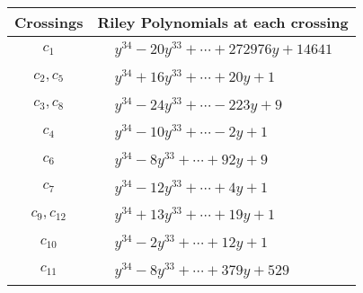 \documentclass[1p]{elsarticle_modified}
\theoremstyle{definition}
\begin{document}
\begin{tabular}{m{50pt}|m{274pt}}
Crossings & \hspace{64pt}Riley Polynomials at each crossing \\
\hline $$\begin{aligned}c_{1}\end{aligned}$$&$\begin{aligned}
&y^{34}-20 y^{33}+\cdots+272976 y+14641
\end{aligned}$\\
\hline $$\begin{aligned}c_{2},c_{5}\end{aligned}$$&$\begin{aligned}
&y^{34}+16 y^{33}+\cdots+20 y+1
\end{aligned}$\\
\hline $$\begin{aligned}c_{3},c_{8}\end{aligned}$$&$\begin{aligned}
&y^{34}-24 y^{33}+\cdots-223 y+9
\end{aligned}$\\
\hline $$\begin{aligned}c_{4}\end{aligned}$$&$\begin{aligned}
&y^{34}-10 y^{33}+\cdots-2 y+1
\end{aligned}$\\
\hline $$\begin{aligned}c_{6}\end{aligned}$$&$\begin{aligned}
&y^{34}-8 y^{33}+\cdots+92 y+9
\end{aligned}$\\
\hline $$\begin{aligned}c_{7}\end{aligned}$$&$\begin{aligned}
&y^{34}-12 y^{33}+\cdots+4 y+1
\end{aligned}$\\
\hline $$\begin{aligned}c_{9},c_{12}\end{aligned}$$&$\begin{aligned}
&y^{34}+13 y^{33}+\cdots+19 y+1
\end{aligned}$\\
\hline $$\begin{aligned}c_{10}\end{aligned}$$&$\begin{aligned}
&y^{34}-2 y^{33}+\cdots+12 y+1
\end{aligned}$\\
\hline $$\begin{aligned}c_{11}\end{aligned}$$&$\begin{aligned}
&y^{34}-8 y^{33}+\cdots+379 y+529
\end{aligned}$\\
\hline
\end{tabular}\\~\\
\end{document}
